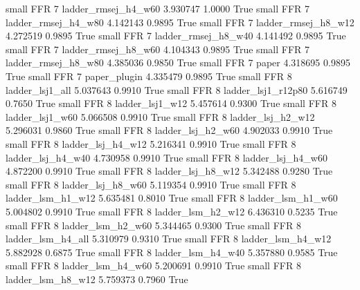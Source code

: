      small      FFR                 7      ladder_rmsej_h4_w60   3.930747      1.0000    True
     small      FFR                 7      ladder_rmsej_h4_w80   4.142143      0.9895    True
     small      FFR                 7      ladder_rmsej_h8_w12   4.272519      0.9895    True
     small      FFR                 7      ladder_rmsej_h8_w40   4.141492      0.9895    True
     small      FFR                 7      ladder_rmsej_h8_w60   4.104343      0.9895    True
     small      FFR                 7      ladder_rmsej_h8_w80   4.385036      0.9850    True
     small      FFR                 7                    paper   4.318695      0.9895    True
     small      FFR                 7             paper_plugin   4.335479      0.9895    True
     small      FFR                 8          ladder_lsj1_all   5.037643      0.9910    True
     small      FFR                 8       ladder_lsj1_r12p80   5.616749      0.7650    True
     small      FFR                 8          ladder_lsj1_w12   5.457614      0.9300    True
     small      FFR                 8          ladder_lsj1_w60   5.066508      0.9910    True
     small      FFR                 8        ladder_lsj_h2_w12   5.296031      0.9860    True
     small      FFR                 8        ladder_lsj_h2_w60   4.902033      0.9910    True
     small      FFR                 8        ladder_lsj_h4_w12   5.216341      0.9910    True
     small      FFR                 8        ladder_lsj_h4_w40   4.730958      0.9910    True
     small      FFR                 8        ladder_lsj_h4_w60   4.872200      0.9910    True
     small      FFR                 8        ladder_lsj_h8_w12   5.342488      0.9280    True
     small      FFR                 8        ladder_lsj_h8_w60   5.119354      0.9910    True
     small      FFR                 8        ladder_lsm_h1_w12   5.635481      0.8010    True
     small      FFR                 8        ladder_lsm_h1_w60   5.004802      0.9910    True
     small      FFR                 8        ladder_lsm_h2_w12   6.436310      0.5235    True
     small      FFR                 8        ladder_lsm_h2_w60   5.344465      0.9300    True
     small      FFR                 8        ladder_lsm_h4_all   5.310979      0.9310    True
     small      FFR                 8        ladder_lsm_h4_w12   5.882928      0.6875    True
     small      FFR                 8        ladder_lsm_h4_w40   5.357880      0.9585    True
     small      FFR                 8        ladder_lsm_h4_w60   5.200691      0.9910    True
     small      FFR                 8        ladder_lsm_h8_w12   5.759373      0.7960    True
